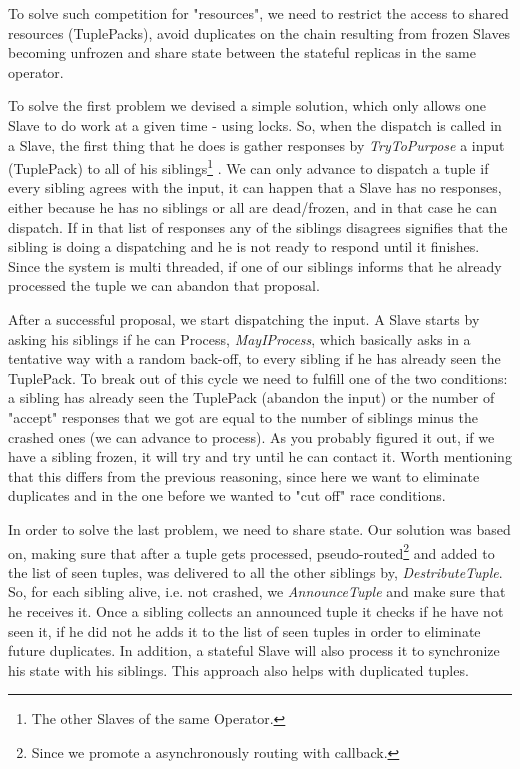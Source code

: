 \documentclass[times, 10pt,twocolumn]{article}
\begin{document}
To solve such competition for "resources", we need to restrict the access to shared resources (TuplePacks), avoid duplicates on the chain resulting from frozen Slaves becoming unfrozen and share state between the stateful replicas in the same operator.

To solve the first problem we devised a simple solution, which only allows one Slave to do work at a given time - using locks. So, when the dispatch is called in a Slave, the first thing that he does is gather responses by \textit{TryToPurpose} a input (TuplePack) to all of his siblings\footnote
{%
	The other Slaves of the same Operator.
}   
. We can only advance to dispatch a tuple if every sibling agrees with the input, it can happen that a Slave has no responses, either because he has no siblings or all are dead/frozen, and in that case he can dispatch. If in that list of responses any of the siblings disagrees signifies that the sibling is doing a dispatching and he is not ready to respond until it finishes. Since the system is multi threaded, if one of our siblings informs that he already processed the tuple we can abandon that proposal.

After a successful proposal, we start dispatching the input. A Slave starts by asking his siblings if he can Process, \textit{MayIProcess}, which basically asks in a tentative way with a random back-off, to every sibling if he has already seen the TuplePack. To break out of this cycle we need to fulfill one of the two conditions: a sibling has already seen the TuplePack (abandon the input) or the number of "accept" responses that we got are equal to the number of siblings minus the crashed ones (we can advance to process). As you probably figured it out, if we have a sibling frozen, it will try and try until he can contact it. Worth mentioning that this differs from the previous reasoning, since here we want to eliminate duplicates and in the one before we wanted to "cut off" race conditions. 

In order to solve the last problem, we need to share state. Our solution was based on, making sure that after a tuple gets processed, pseudo-routed\footnote
{%
	Since we promote a asynchronously routing with callback.
}   
and added to the list of seen tuples, was delivered to all the other siblings by, \textit{DestributeTuple}. So, for each sibling alive, i.e. not crashed, we \textit{AnnounceTuple} and make sure that he receives it. Once a sibling collects an announced tuple it checks if he have not seen it, if he did not he adds it to the list of seen tuples in order to eliminate future duplicates. In addition, a stateful Slave will also process it to synchronize his state with his siblings. This approach also helps with duplicated tuples.
\end{document}
